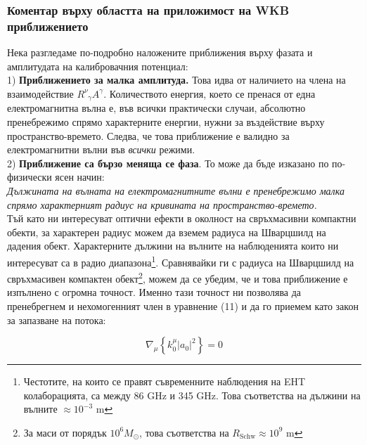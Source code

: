 \subsubsection{Коментар върху областта на приложимост на WKB приближението}

Нека разгледаме по-подробно наложените приближения върху фазата и амплитудата на калибровачния потенциал:\\

1) \textbf{Приближението за малка амплитуда.} Това идва от наличието на члена на взаимодействие $R^\nu_{\,\,\,\gamma} A^\gamma$. Количеството енергия, което се пренася от една електромагнитна вълна е, във всички практически случаи, абсолютно пренебрежимо спрямо характерните енергии, нужни за въздействие върху пространство-времето. Следва, че това приближение е валидно за електромагнитни вълни във \emph{всички} режими.\\

2) \textbf{Приближение са бързо меняща се фаза}. То може да бъде изказано по по-физически ясен начин:\\

\emph{Дължината на вълната на електромагнитните вълни е пренебрежимо малка спрямо характерният радиус на кривината на пространство-времето.}\\

Тъй като ни интересуват оптични ефекти в околност на свръхмасивни компактни обекти, за характерен радиус можем да вземем радиуса на Шварцшилд на дадения обект. Характерните дължини на вълните на наблюденията които ни интересуват са в радио диапазона\footnote{Честотите, на които се правят съвременните наблюдения на EHT колаборацията, са между 86 GHz и 345 GHz. Това съответства на дължини на вълните $\approx 10^{-3}$ m}. Сравнявайки ги с радиуса на Шварцшилд на свръхмасивен компактен обект\footnote{За маси от порядък $10^6 M_\odot$, това съответства на $R_{\text{Schw}}\approx 10^9$ m}, можем да се убедим, че и това приближение е изпълнено с огромна точност. Именно тази точност ни позволява да пренебрегнем и нехомогенният член в уравнение (11) и да го приемем като закон за запазване на потока:

\begin{equation}
		\nabla_\mu\left\{k_0^\mu |a_0|^2\right\} = 0
\end{equation}

